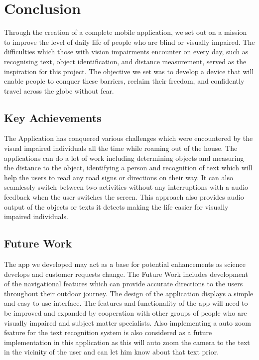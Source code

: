 \documentclass[MScCS]{uccthesis}
\begin{document}
\chapter{Conclusion}

Through the creation of a complete mobile application, we set out on a mission to improve the level of daily life of people who are blind or visually impaired. The difficulties which those with vision impairments encounter on every day, such as recognising text, object identification, and distance measurement, served as the inspiration for this project. The objective we set was to develop a device that will enable people to conquer these barriers, reclaim their freedom, and confidently travel across the globe without fear.

\section{Key Achievements}

The Application has conquered various challenges which were encountered by the visual impaired individuals all the time while roaming out of the house. The applications can do a lot of work including determining objects and measuring the distance to the object, identifying a person and recognition of text which will help the users to read any road signs or directions on their way. It can also seamlessly switch between two activities without any interruptions with a audio feedback when the user switches the screen. This approach also provides audio output of the objects or texts it detects making the life easier for visually impaired individuals.

\section{Future Work}

The app we developed may act as a base for potential enhancements as science develops and customer requests change. The Future Work includes development of the navigational features which can provide accurate directions to the users throughout their outdoor journey. The design of the application displays a simple and easy to use interface. The features and functionality of the app will need to be improved and expanded by cooperation with other groups of people who are visually impaired and subject matter specialists. Also implementing a auto zoom feature for the text recognition system is also considered as a future implementation in this application as this will auto zoom the camera to the text in the vicinity of the user and can let him know about that text prior.
\end{document}
